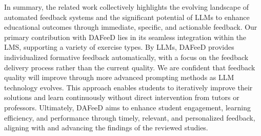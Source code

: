 \documentclass[manuscript,screen,review]{acmart}
\begin{document}
In summary, the related work collectively highlights the evolving landscape of automated feedback systems and the significant potential of LLMs to enhance educational outcomes through immediate, specific, and actionable feedback. Our primary contribution with DAFeeD lies in its seamless integration within the LMS, supporting a variety of exercise types. By LLMs, DAFeeD provides individualized formative feedback automatically, with a focus on the feedback delivery process rather than the current quality. We are confident that feedback quality will improve through more advanced prompting methods as LLM technology evolves. This approach enables students to iteratively improve their solutions and learn continuously without direct intervention from tutors or professors. Ultimately, DAFeeD aims to enhance student engagement, learning efficiency, and performance through timely, relevant, and personalized feedback, aligning with and advancing the findings of the reviewed studies.









\end{document}
